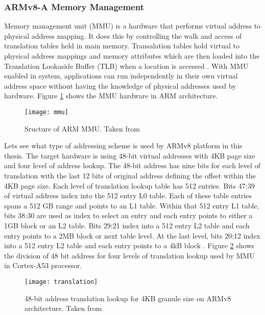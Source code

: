 \subsubsection{ARMv8-A Memory Management\label{sec:armv8_mem}}
Memory management unit (MMU) is a hardware that performs virtual address to physical address mapping. It does this by controlling the walk and access of translation tables held in main memory. Transalation tables hold virtual to physical address mappings and memory attributes which are then loaded into the Translation Lookaside Buffer (TLB) when a location is accessed \cite{cortexA53}.
With MMU enabled in system, applications can run independently in their own virtual address space without having the knowledge of physical addresses used by hardware. Figure \ref{mmu} shows the MMU hardware in ARM architecture.
\begin{figure}[!htbp]
	\centering
	\texttt{[image: mmu]}
	\caption{Sructure of ARM MMU. Taken from \cite{mmu}}
	\label{mmu}
\end{figure}

Lets see what type of addressing scheme is used by ARMv8 platform in this thesis. The target hardware is using 48-bit virtual addresses with 4KB page size and four level of address lookup. The 48-bit address has nine bits for each level of translation with the last 12 bits of original address defining the offset within the 4KB page size. Each level of translation lookup table has 512 entries.
Bits 47:39 of virtual address index into the 512 entry L0 table. Each of these table entries spans a 512 GB range and points to an L1 table. Within that 512 entry L1 table, bits 38:30 are used as index to select an entry and each entry points to either a 1GB block or an L2 table. Bits 29:21 index into a 512 entry L2 table and each entry points to a 2MB block or next table level. At the last level, bits 20:12 index into a 512 entry L2 table and each entry points to a 4kB block \cite{translation}. Figure \ref{translation} shows the division of 48 bit address for four levels of translation lookup used by MMU in Cortex-A53 processor.

\begin{figure}[!htbp]
	\centering
	\texttt{[image: translation]}
	\caption{48-bit address translation lookup for 4KB granule size on ARMv8 architecture. Taken from \cite{translation}}
	\label{translation}
\end{figure}


